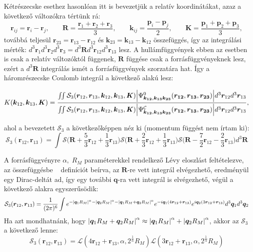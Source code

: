 \documentclass[10pt,a4paper]{article}
\numberwithin{equation}{subsection}
\numberwithin{figure}{section}
\begin{document}
Kétrészecske esethez hasonlóan itt is bevezetjük a relatív koordinátákat, azaz a következő változókra tértünk rá:
\begin{equation}
\bm{r}_{ij} = \bm{r}_i-\bm{r}_j,\;\;\;\;\;\;\;
\bm{R}=\frac{\bm{r}_1+\bm{r}_2+\bm{r}_3}{3},\;\;\;\;\;\;\;
\bm{k}_{ij}=\frac{\bm{p}_{i}-\bm{p}_{j}}{2},\;\;\;\;\;\;\;
\bm{K} = \frac{\bm{p}_1+\bm{p}_2+\bm{p}_3}{3},
\label{eq:CMF3}
\end{equation}
továbbá teljesül $\bm{r}_{23}=\bm{r}_{13}-\bm{r}_{12}$ és $\bm{k}_{23}=\bm{k}_{13}-\bm{k}_{12}$ összefüggés, így az integrálási mérték: $d^3 \bm{r}_1d^3 \bm{r}_2d^3 \bm{r}_3=d^3\bm{R} d^3\bm{r}_{12} d^3\bm{r}_{13}$ lesz. A hullámfüggvények ebben az esetben is csak a relatív változóktól függenek, $\bm{R}$ függése csak a forrásfüggvényeknek lesz, ezért a $d^3\bm{R}$ integrálás ismét a forrásfüggvények szorzatára hat. Így a háromrészecske Coulomb integrál a következő alakú lesz:

\begin{equation}
K(\bm{k}_{12},\bm{k}_{13},\bm{K})=
\frac{
\iint
\mathcal{S}_{3}(\bm{r}_{12}, \bm{r}_{13}, \bm{k}_{12}, \bm{k}_{13}, \bm{K})
\abs{\Psi^{0}_{\bm{k_{12}},\bm{k_{13}}\bm{k_{23}}}(\bm{r_{12}},\bm{r_{13}},\bm{r_{23}})} d^3 \bm{r}_{12}d^3 \bm{r}_{13}
}{\iint
\mathcal{S}_{3}(\bm{r}_{12}, \bm{r}_{13}, \bm{k}_{12}, \bm{k}_{13}, \bm{K})
\abs{\Psi^{\mathcal{C}}_{\bm{k_{12}},\bm{k_{13}}\bm{k_{23}}}(\bm{r_{12}},\bm{r_{13}},\bm{r_{23}})} d^3 \bm{r}_{12}d^3 \bm{r}_{13}},
\label{eq:K3}
\end{equation}

ahol a bevezetett $\mathcal{S}_3$ a következőképpen néz ki (momentum függést nem írtam ki):
\begin{equation}
\mathcal{S}_{3}(\bm{r}_{12}, \bm{r}_{13}) =
\int 
\mathcal{S}\bigg(\bm{R}+\frac{5}{3}\bm{r}_{12}+\frac{1}{3}\bm{r}_{13}\bigg)
\mathcal{S}\bigg(\bm{R}+\frac{2}{3}\bm{r}_{12}+\frac{1}{3}\bm{r}_{13}\bigg)
\mathcal{S}\bigg(\bm{R}-\frac{7}{2}\bm{r}_{12}-\frac{2}{3}\bm{r}_{13}\bigg)
d^3\bm{R}
\end{equation}

A forrásfüggvényre $\alpha,\;R_M$ paraméterekkel rendelkező Lévy eloszlást feltételezve, az összefüggésbe ~ definíciót beírva, az $\bm{R}$-re vett integrál elvégezhető, eredményül egy Dirac-deltát ad, így egy további $\bm{q}$-ra vett integrál is elvégezhető, végül a következő alakra egyszerűsödik: 
\begin{equation}
\mathcal{S}_3(\bm{r}_{12}, \bm{r}_{13}) = \frac{1}{(2\pi)^6}
\int
e^{-\abs{\bm{q}_1R_M}^\alpha-\abs{\bm{q}_2R_M}^\alpha-\abs{\bm{q}_1R_M+\bm{q}_2R_M}^\alpha}
e^{-i\bm{q}_1(4\bm{r}_{12}+\bm{r}_{13})}
e^{i\bm{q}_2(3\bm{r}_{12}+\bm{r}_{13})}
d^3\bm{q}_1d^3\bm{q}_2
\end{equation}
Ha azt mondhatnánk, hogy $\abs{\bm{q}_1R_M+\bm{q}_2R_M}^\alpha\approx \abs{\bm{q}_1R_M}^\alpha+\abs{\bm{q}_2R_M}^\alpha$, akkor az $\mathcal{S}_3$ a következő lenne:
\begin{equation}
\mathcal{S}_3(\bm{r}_{12}, \bm{r}_{13})=\mathcal{L}(4\bm{r}_{12}+\bm{r}_{13}, \alpha, 2^{\frac{1}{\alpha}}R_M)
\mathcal{L}(3\bm{r}_{12}+\bm{r}_{13}, \alpha, 2^{\frac{1}{\alpha}}R_M)
\end{equation}
\end{document}
